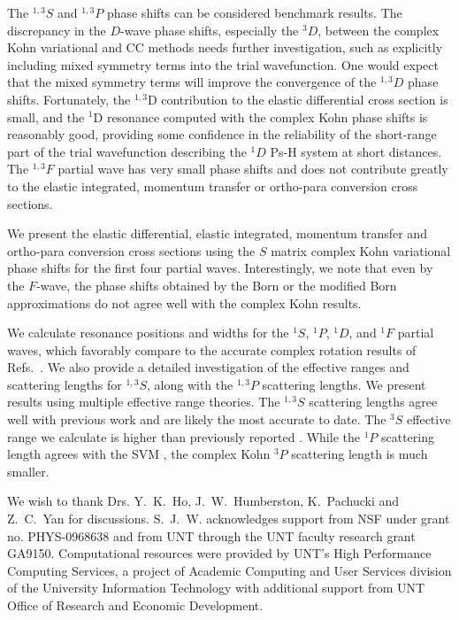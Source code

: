 \documentclass[preprint,showpacs,showkeys,preprintnumbers,amsmath,amssymb,longbibliography,pra,aps]{revtex4-1}
\begin{document}
The $^{1,3}S$ and $^{1,3}P$ phase shifts can be considered benchmark results. 
The discrepancy in the $D$-wave phase shifts, especially the $^3D$, between the 
complex Kohn variational and CC methods needs further investigation, such as 
explicitly including mixed symmetry terms into the trial wavefunction. One would 
expect that the mixed symmetry terms will improve the convergence of the $^{1,3}D$ 
phase shifts. Fortunately, the $^{1,3}$D contribution to the elastic differential 
cross section is small, and the $^1$D resonance computed with the complex Kohn 
phase shifts is reasonably good, providing some confidence in the reliability 
of the short-range part of the trial wavefunction describing the $^1D$ Ps-H 
system at short distances. The $^{1,3}F$ partial wave has very small phase 
shifts and does not contribute greatly to the elastic integrated, momentum transfer
or ortho-para conversion cross sections.

We present the elastic differential, elastic integrated, momentum 
transfer and ortho-para conversion cross sections using the $S$ matrix 
complex Kohn variational phase shifts for the first four partial waves. 
Interestingly, we note that even by the $F$-wave, the phase shifts obtained 
by the Born or the modified Born approximations do not agree well with the 
complex Kohn results.

We calculate resonance positions and widths for the $^1S$, $^1P$, $^1D$, and
$^1F$ partial waves, which favorably compare to the accurate complex 
rotation results of Refs.~\cite{Yan1999,Yan1998a,Ho1998,Ho2000}. We also 
provide a detailed investigation of the effective ranges and scattering 
lengths for $^{1,3}S$, along with the $^{1,3}P$ scattering lengths. We 
present results using multiple effective range theories.
The $^{1,3}S$ scattering 
lengths agree well with previous work
\cite{VanReeth2003,Blackwood2002,Walters2004,Ivanov2002}
and are likely the most accurate to 
date. The $^3S$ effective range we calculate is higher than previously 
reported \cite{VanReeth2003,Blackwood2002,Ivanov2002}.
While the $^1P$ scattering length agrees with the SVM \cite{Ivanov2002}, 
the complex Kohn $^3P$ scattering length is much smaller.


\begin{acknowledgments}
We wish to thank Drs. Y.~K.~Ho, J.~W.~Humberston, K.~Pachucki and Z.~C.~Yan 
for discussions. S.~J.~W. acknowledges support from NSF under grant no.
PHYS-0968638 and from UNT through the UNT faculty research grant GA9150. 
Computational resources were provided by UNT's High Performance Computing 
Services, a project of Academic Computing and User Services division of the 
University Information Technology with additional support from UNT Office of 
Research and Economic Development.
\end{acknowledgments}



\end{document}
